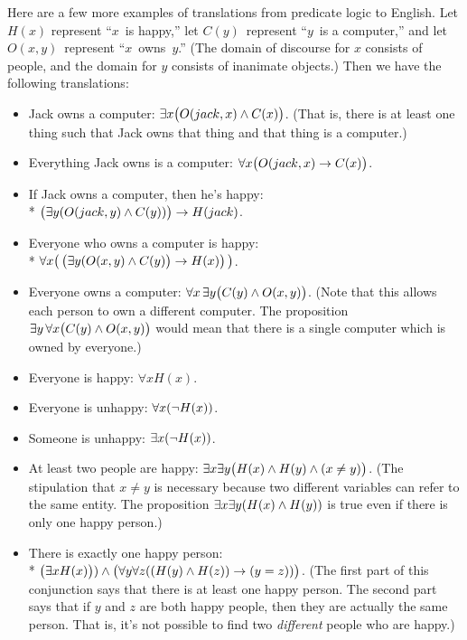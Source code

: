 Here are a few more examples of translations from predicate logic
to English.  Let $H(x)$ represent ``$x$~is happy,'' let
$C(y)$~represent ``$y$~is a computer,'' and let $O(x,y)$~represent
``$x$~owns~$y$.''  (The domain of discourse for $x$ consists of 
people, and the domain for $y$ consists of inanimate objects.)
Then we have the following translations:

\begin{itemize}
\setlength{\itemsep}{0pt plus 1 pt}
\setlength{\parsep}{0pt plus 1 pt}
\item Jack owns a computer: $\exists x\big(O(jack,x)\wedge C(x)\big)$.
(That is, there is at least one thing such that Jack owns that thing and that thing
is a computer.)
\item Everything Jack owns is a computer: $\forall x\big(O(jack,x)\rightarrow C(x)\big)$.
\item If Jack owns a computer, then he's happy:\\*
\hspace*{0.5in}$\big(\exists y(O(jack,y)\wedge C(y))\big)\rightarrow H(jack)$.
\item Everyone who owns a computer is happy:\\*
\hspace*{0.5in} $\forall x\big(\,\big(\exists y(O(x,y)\wedge C(y)\big)\rightarrow H(x)\big)\,\big)$.
\item Everyone owns a computer: $\forall x\,\exists y\big(C(y)\wedge O(x,y)\big)$.
(Note that this allows each person to own a different computer.
The proposition $\exists y\,\forall x\big(C(y)\wedge O(x,y)\big)$
would mean that there is a single computer which is owned by
everyone.)
\item Everyone is happy: $\forall xH(x)$.
\item Everyone is unhappy: $\forall x(\lnot H(x))$.
\item Someone is unhappy: $\exists x(\lnot H(x))$.
\item At least two people are happy:
 $\exists x \exists y\big(H(x) \wedge H(y) \wedge (x\ne y)\big)$.  (The stipulation
 that $x\ne y$ is necessary because two different variables can refer to
 the same entity.  The proposition $\exists x\exists y(H(x)\wedge H(y))$ is
 true even if there is only one happy person.)
\item There is exactly one happy person:\\*
 \hspace*{0.5 in}$\big(\exists x H(x)\big)) \wedge \big(\forall y \forall z((H(y)\wedge H(z))\rightarrow (y=z))\big)$.
 (The first part of this conjunction says that there is at least one happy person.
 The second part says that if $y$ and $z$ are both happy people, then they are actually
 the same person. That is, it's not possible to find two \emph{different} people who
 are happy.)
\end{itemize}

